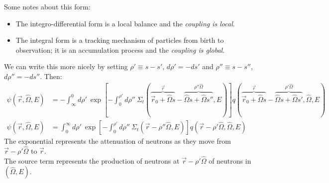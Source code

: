 \documentclass[12pt]{article}
\newcommand{\rvec}{\ensuremath{\vec{r}}}
\newcommand{\vOmega}{\ensuremath{\hat{\Omega}}}
\begin{document}
Some notes about this form:
\begin{itemize}
\item The integro-differential form is a local balance and the \textit{coupling is local}.
\item The integral form is a tracking mechanism of particles from birth to observation; it is an accumulation process and the \textit{coupling is global}. 
\end{itemize}
%
We can write this more nicely by setting $\rho' \equiv s-s'$, $d\rho' = -ds'$ and  $\rho'' \equiv s-s''$, $d\rho'' = -ds''$. Then:
\begin{align*}
\psi(\rvec, \vOmega, E) &= -\int_{\infty}^0 d\rho' \: \exp[-\int_0^{\rho'} d\rho'' \: \Sigma_t(\overbrace{\rvec_0 + \vOmega s}^{\vec{r}} - \overbrace{\vOmega s + \vOmega s''}^{\rho''\vOmega}, E)]q(\overbrace{\rvec_0 + \vOmega s}^{\vec{r}} - \overbrace{\vOmega s + \vOmega s'}^{\rho'\vOmega}, \vOmega, E) \\
\psi(\rvec, \vOmega, E) &=\int_0^{\infty} d\rho' \:\exp[-\int_0^{\rho'} d\rho'' \: \Sigma_t(\rvec-\rho''\vOmega,E)]q(\rvec-\rho'\vOmega,\vOmega,E)
\end{align*}
%
The exponential represents the attenuation of neutrons as they move from $\rvec-\rho'\vOmega$ to $\rvec$. \\
The source term represents the production of neutrons at $\rvec-\rho'\vOmega$ of neutrons in $(\vOmega, E)$.
\end{document}
